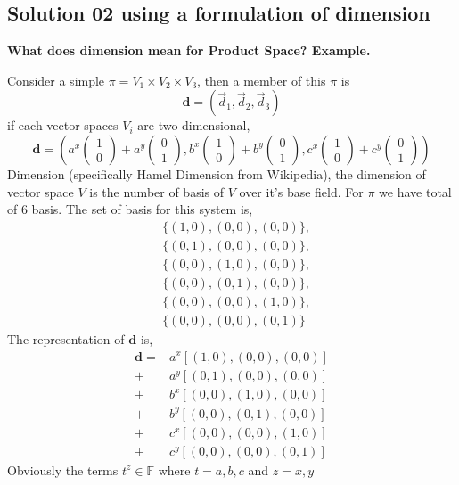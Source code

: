 \documentclass[letter]{article}
\begin{document}
\subsection*{Solution 02 using a formulation of dimension} 
\begin{tcolorbox}[colback=white,colframe=NordBlue,sharpish corners]
	\textbf{What does dimension mean for Product Space? Example. } \hspace{0.5cm} 

Consider a simple $\pi = V_1 \times V_2 \times V_3$, then a member of this $\pi$ is
\[
	\mathbf{d} = (\vec{d}_1 , \vec{d}_2, \vec{d}_3)
\]
if each vector spaces $V_i$ are two dimensional, 
\[
\mathbf d = 
\left(
a^{x} \begin{pmatrix} 1 \\ 0 \end{pmatrix}    +
a^{y} \begin{pmatrix} 0 \\ 1 \end{pmatrix} ,
b^{x} \begin{pmatrix} 1 \\ 0 \end{pmatrix}    +
b^{y} \begin{pmatrix} 0 \\ 1 \end{pmatrix} , 
c^{x} \begin{pmatrix} 1 \\ 0 \end{pmatrix}    +
c^{y} \begin{pmatrix} 0 \\ 1 \end{pmatrix} 
\right)
\] 
Dimension (specifically Hamel Dimension from Wikipedia), the dimension of vector space $V$ is the number of basis of $V$ over it's base field. For $\pi$ we have total of $6$ basis. The set of basis for this system is, 
\begin{align*} 
	&\{(1,0), (0,0), (0,0)\},\\
	&\{(0,1), (0,0), (0,0)\},\\ 
	&\{(0,0), (1,0), (0,0)\},\\ 
	&\{(0,0), (0,1), (0,0)\},\\ 
	&\{(0,0), (0,0), (1,0)\},\\ 
	&	\{(0,0), (0,0), (0,1)\} 
\end{align*}
The representation of $\mathbf d$ is, 
\begin{align*} 
	\mathbf d = 
	& a^{x}[(1,0), (0,0), (0,0)] \\+
	&a^{y}[(0,1), (0,0), (0,0)]  \\+ 
	&b^{x}[(0,0), (1,0), (0,0)]  \\+  
	&b^{y}[(0,0), (0,1), (0,0)] \\+ 
	&c^{x}[(0,0), (0,0), (1,0)]  \\+
	&c^{y}[(0,0), (0,0), (0,1)]
\end{align*}
Obviously the terms $t^{z}\in \mathbb{F}$ where $t = a,b,c$ and $z= x,y$
\end{tcolorbox}
\end{document}
